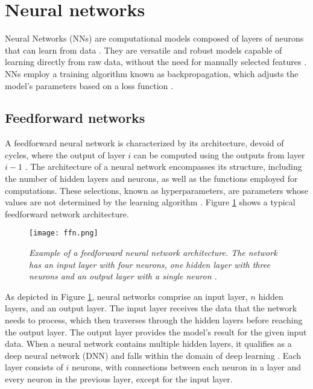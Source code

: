 \section{Neural networks}

Neural Networks (NNs) are computational models composed of layers of neurons that can learn from data \cite{oshea2015introduction}. They are versatile and robust models capable of learning directly from raw data, without the need for manually selected features \cite{lipton2015critical}. NNs employ a training algorithm known as backpropagation, which adjusts the model's parameters based on a loss function \cite{lipton2015critical}.

\subsection{Feedforward networks}

A feedforward neural network is characterized by its architecture, devoid of cycles, where the output of layer \(i\) can be computed using the outputs from layer \(i - 1\) \cite{lipton2015critical}. The architecture of a neural network encompasses its structure, including the number of hidden layers and neurons, as well as the functions employed for computations. These selections, known as hyperparameters, are parameters whose values are not determined by the learning algorithm \cite{nnanddl}. Figure \ref{fig:ffn} shows a typical feedforward network architecture.


\begin{figure}[H]
    \centering
    \texttt{[image: ffn.png]}
    \caption{
        \it{Example of a feedforward neural network architecture. The network has an
            input layer with four neurons, one hidden layer with three neurons and an output layer with a single neuron \cite{lipton2015critical}.}
    }
    \label{fig:ffn}
\end{figure}

As depicted in Figure \ref{fig:ffn}, neural networks comprise an input layer, \(n\) hidden layers, and an output layer. The input layer receives the data that the network needs to process, which then traverses through the hidden layers before reaching the output layer. The output layer provides the model's result for the given input data. When a neural network contains multiple hidden layers, it qualifies as a deep neural network (DNN) and falls within the domain of deep learning \cite{oshea2015introduction}. Each layer consists of \(i\) neurons, with connections between each neuron in a layer and every neuron in the previous layer, except for the input layer.

